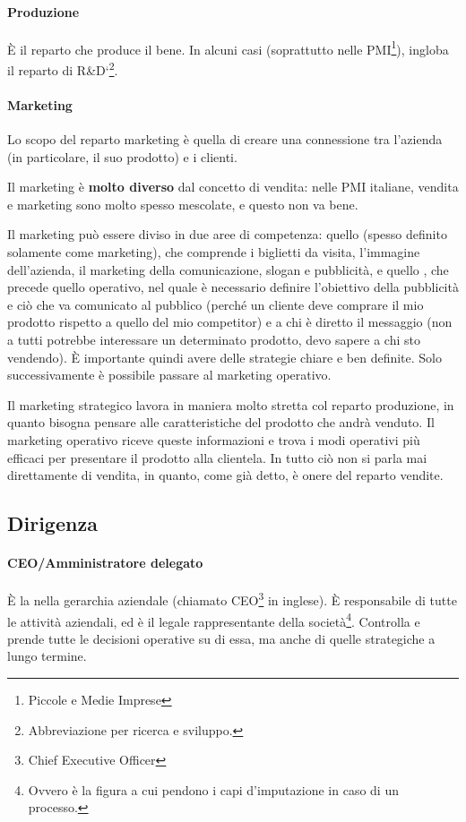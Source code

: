 \paragraph*{Produzione} È il reparto che produce il bene. In alcuni casi
(soprattutto nelle PMI\footnote{Piccole e Medie Imprese}), ingloba il
reparto di R\&D`\footnote{Abbreviazione per ricerca e sviluppo.}.

\paragraph*{Marketing}
\begin{definition}[Marketing]
Lo scopo del reparto marketing è quella di creare una connessione tra l'azienda
(in particolare, il suo prodotto) e i clienti.
\end{definition}

\noindent Il marketing è \textbf{molto diverso} dal concetto di vendita: nelle 
PMI italiane, vendita e marketing sono molto spesso mescolate, e questo non va 
bene.

Il marketing può essere diviso in due aree di competenza: quello
 (spesso definito solamente come marketing), che comprende 
i biglietti da visita, l'immagine dell'azienda, il marketing della 
comunicazione, slogan e pubblicità, e quello , che 
precede quello operativo, nel quale è necessario definire l'obiettivo della 
pubblicità e ciò che va comunicato al pubblico (perché un cliente deve comprare 
il mio prodotto rispetto a quello del mio competitor) e a chi è diretto il 
messaggio (non a tutti potrebbe interessare un determinato prodotto, devo 
sapere a chi sto vendendo). È importante quindi avere delle strategie chiare e 
ben definite. Solo successivamente è possibile passare al marketing operativo.

Il marketing strategico lavora in maniera molto stretta col reparto produzione,
in quanto bisogna pensare alle caratteristiche del prodotto che andrà venduto.
Il marketing operativo riceve queste informazioni e trova i modi operativi più
efficaci per presentare il prodotto alla clientela. In tutto ciò non si parla
mai direttamente di vendita, in quanto, come già detto, è onere del reparto
vendite.

\subsection{Dirigenza}

\paragraph*{CEO/Amministratore delegato} È la  nella gerarchia aziendale (chiamato CEO\footnote{Chief Executive 
Officer} in inglese). È responsabile di tutte le attività aziendali, ed è il 
legale rappresentante della società\footnote{Ovvero è la figura a cui pendono i 
capi d'imputazione in caso di un processo.}. Controlla e prende tutte le 
decisioni operative su di essa, ma anche di quelle strategiche a lungo 
termine.

